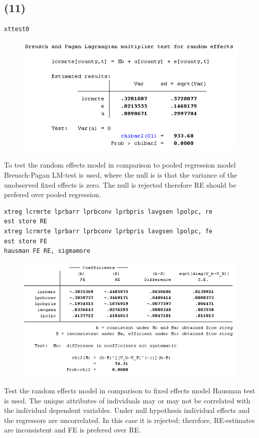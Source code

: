 \documentclass[12pt,a4paper, oneside]{extreport}
\begin{document}
\subsection*{(11)}

\begin{verbatim}
xttest0
\end{verbatim}

\begin{figure}[H]
	\centering
	\includegraphics[width=0.7\linewidth]{screenshot034}
	\label{fig:screenshot001}
\end{figure}

To test the random effects model in comparison to pooled
regression model Breusch-Pagan LM-test is used, where the null is is that the variance of the unobserved fixed effects is zero. The null is rejected therefore RE should be prefered over pooled regression.




\begin{verbatim}
xtreg lcrmrte lprbarr lprbconv lprbpris lavgsen lpolpc, re
est store RE
xtreg lcrmrte lprbarr lprbconv lprbpris lavgsen lpolpc, fe
est store FE
hausman FE RE, sigmamore
\end{verbatim}

\begin{figure}[H]
	\centering
	\includegraphics[width=0.7\linewidth]{screenshot037}
	\label{fig:screenshot001}
\end{figure}


Test the random effects model in comparison to  fixed effects model Hausman test is used.
The unique attributes of individuals may or may not be correlated with the individual dependent variables. Under null hypothesis individual effects and the regressors are uncorrelated. In this case it is rejected; therefore, RE-estimates are inconsistent and FE is prefered over RE.  
\end{document}
